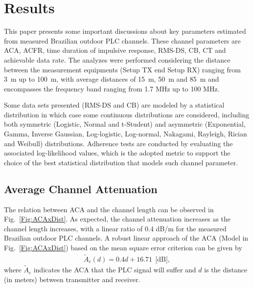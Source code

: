 \documentclass[journal]{IEEEtran}
\begin{document}
\section{Results} \label{sec-caracteristicas_canal_outdoor} 
This paper presents some important discussions about key parameters estimated from measured Brazilian outdoor PLC channels. These channel parameters are \ac{ACA}, \ac{ACFR}, time duration of impulsive response, \ac{RMS-DS}, \ac{CB}, \ac{CT} and achievable data rate. The analyzes were performed considering the distance between the measurement equipments (Setup TX end Setup RX) ranging from 3~m up to 100~m, with average distances of 15~m, 50~m and 85~m and encompasses the frequency band ranging from 1.7 MHz up to 100 MHz.

Some data sets presented (RMS-DS and CB) are modeled by a statistical distribution in which case some continuous distributions are considered, including both symmetric (Logistic, Normal and t-Student) and asymmetric (Exponential, Gamma, Inverse Gaussian, Log-logistic, Log-normal, Nakagami, Rayleigh, Rician and Weibull) distributions. Adherence tests are conducted by evaluating the associated log-likelihood values, which is the adopted metric to support the choice of the best statistical distribution that models such channel parameter.

\subsection{Average Channel Attenuation}\label{sec-aca}
The relation between \ac{ACA} and the channel length can be observed in Fig.~\ref{Fig:ACAxDist}. As expected, the channel attenuation increases as the channel length increases, with a linear ratio of 0.4 dB/m for the measured Brazilian outdoor PLC channels.
A robust linear approach of the ACA (Model in Fig.~\ref{Fig:ACAxDist}) based on the mean square error criterion can be given by 
\begin{eqnarray} \label{eq-ACAxDist}
\widetilde{A}_c(d) = 0.4d +16.71 \   \  \mbox{[dB]},    
\end{eqnarray}
where  $\widetilde{A}_c$ indicates the ACA that the PLC signal will suffer and $d$ is the distance (in meters) between transmitter and receiver. 
\end{document}
